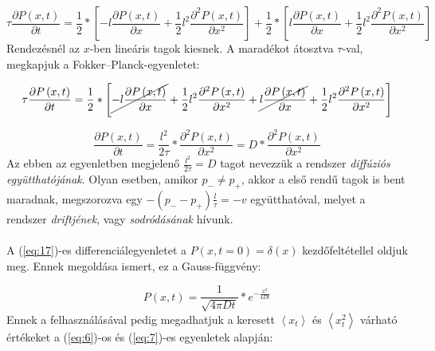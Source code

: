 \begin{equation} \label{eq:15}
    \tau \frac{\partial P \left( x, t \right)}{\partial t}
    =
    \frac{1}{2} * \left[ -l \frac{\partial P \left( x, t \right)}{\partial x} + \frac{1}{2} l^{2} \frac{\partial^{2} P \left( x, t \right)}{\partial x^{2}} \right] + \frac{1}{2} * \left[ l \frac{\partial P \left( x, t \right)}{\partial x} + \frac{1}{2} l^{2} \frac{\partial^{2} P \left( x, t \right)}{\partial x^{2}} \right]
\end{equation}
Rendezésnél az $x$-ben lineáris tagok kiesnek. A maradékot átosztva $\tau$-val, megkapjuk a Fokker--Planck-egyenletet:

\begin{equation} \label{eq:16}
    \tau \frac{\partial P \left( x, t \right)}{\partial t}
    =
    \frac{1}{2} * \left[ \cancel{-l \frac{\partial P \left( x, t \right)}{\partial x}} + \frac{1}{2} l^{2} \frac{\partial^{2} P \left( x, t \right)}{\partial x^{2}} + \cancel{l \frac{\partial P \left( x, t \right)}{\partial x}} + \frac{1}{2} l^{2} \frac{\partial^{2} P \left( x, t \right)}{\partial x^{2}} \right]
\end{equation}

\begin{equation} \label{eq:17}
    \frac{\partial P \left( x, t \right)}{\partial t} 
    =
    \frac{l^{2}}{2 \tau} * \frac{\partial^{2} P \left( x, t \right)}{\partial x^{2}}
    =
    D * \frac{\partial^{2} P \left( x, t \right)}{\partial x^{2}}
\end{equation}
Az ebben az egyenletben megjelenő $\frac{l^{2}}{2 \tau} = D$ tagot nevezzük a rendszer \emph{diffúziós együtthatójának}. Olyan esetben, amikor $p_{-} \neq p_{+}$, akkor a első rendű tagok is bent maradnak, megszorozva egy $- \left( p_{-} - p_{+} \right) \frac{l}{\tau} = - v$ együtthatóval, melyet a rendszer \emph{driftjének}, vagy \emph{sodródásának} hívunk.
\\ \\
A (\ref{eq:17})-es differenciálegyenletet a $P \left( x, t=0 \right) = \delta \left( x \right)$ kezdőfeltétellel oldjuk meg. Ennek megoldása ismert, ez a Gauss-függvény:

\begin{equation} \label{eq:18}
    P \left( x, t \right) = \frac{1}{\sqrt{4 \pi D t}} * e^{-\tfrac{x^{2}}{4Dt}}
\end{equation}
Ennek a felhasználásával pedig megadhatjuk a keresett $\left< x_{t} \right>$ és $\left< x_{t}^{2} \right>$ várható értékeket a (\ref{eq:6})-os és (\ref{eq:7})-es egyenletek alapján:

